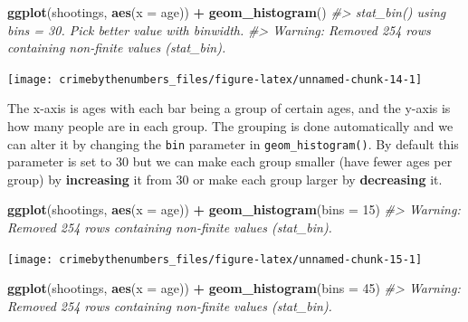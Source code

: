 \documentclass[
  12pt,
]{book}
\newenvironment{Shaded}{\begin{snugshade}}{\end{snugshade}}
\newcommand{\CommentTok}[1]{\textcolor[rgb]{0.37,0.37,0.37}{\textit{#1}}}
\newcommand{\DataTypeTok}[1]{\textcolor[rgb]{0.27,0.27,0.27}{#1}}
\newcommand{\DecValTok}[1]{\textcolor[rgb]{0.06,0.06,0.06}{#1}}
\newcommand{\KeywordTok}[1]{\textcolor[rgb]{0.27,0.27,0.27}{\textbf{#1}}}
\newcommand{\NormalTok}[1]{#1}
\newcommand{\OperatorTok}[1]{\textcolor[rgb]{0.43,0.43,0.43}{\textbf{#1}}}
\newcommand{\StringTok}[1]{\textcolor[rgb]{0.5,0.5,0.5}{#1}}
\begin{document}
\begin{Shaded}
\begin{Highlighting}[]
\KeywordTok{ggplot}\NormalTok{(shootings, }\KeywordTok{aes}\NormalTok{(}\DataTypeTok{x =}\NormalTok{ age)) }\OperatorTok{+}\StringTok{ }
\StringTok{  }\KeywordTok{geom\_histogram}\NormalTok{()}
\CommentTok{\#\textgreater{} \textasciigrave{}stat\_bin()\textasciigrave{} using \textasciigrave{}bins = 30\textasciigrave{}. Pick better value with \textasciigrave{}binwidth\textasciigrave{}.}
\CommentTok{\#\textgreater{} Warning: Removed 254 rows containing non{-}finite values (stat\_bin).}
\end{Highlighting}
\end{Shaded}

\begin{center}\texttt{[image: crimebythenumbers\_files/figure-latex/unnamed-chunk-14-1]} \end{center}

The x-axis is ages with each bar being a group of certain ages, and the y-axis is how many people are in each group. The grouping is done automatically and we can alter it by changing the \texttt{bin} parameter in \texttt{geom\_histogram()}. By default this parameter is set to 30 but we can make each group smaller (have fewer ages per group) by \textbf{increasing} it from 30 or make each group larger by \textbf{decreasing} it.

\begin{Shaded}
\begin{Highlighting}[]
\KeywordTok{ggplot}\NormalTok{(shootings, }\KeywordTok{aes}\NormalTok{(}\DataTypeTok{x =}\NormalTok{ age)) }\OperatorTok{+}\StringTok{ }
\StringTok{  }\KeywordTok{geom\_histogram}\NormalTok{(}\DataTypeTok{bins =} \DecValTok{15}\NormalTok{)}
\CommentTok{\#\textgreater{} Warning: Removed 254 rows containing non{-}finite values (stat\_bin).}
\end{Highlighting}
\end{Shaded}

\begin{center}\texttt{[image: crimebythenumbers\_files/figure-latex/unnamed-chunk-15-1]} \end{center}

\begin{Shaded}
\begin{Highlighting}[]
\KeywordTok{ggplot}\NormalTok{(shootings, }\KeywordTok{aes}\NormalTok{(}\DataTypeTok{x =}\NormalTok{ age)) }\OperatorTok{+}\StringTok{ }
\StringTok{  }\KeywordTok{geom\_histogram}\NormalTok{(}\DataTypeTok{bins =} \DecValTok{45}\NormalTok{)}
\CommentTok{\#\textgreater{} Warning: Removed 254 rows containing non{-}finite values (stat\_bin).}
\end{Highlighting}
\end{Shaded}
\end{document}
